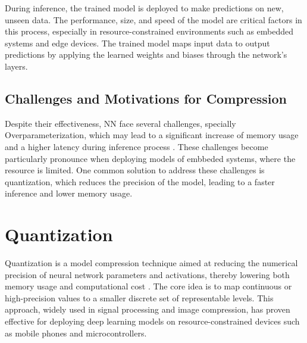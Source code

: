 During inference, the trained model is deployed to make predictions on new, unseen data. The performance, size, and speed of the model are critical factors in this process, especially in resource-constrained environments such as embedded systems and edge devices. The trained model maps input data to output predictions by applying the learned weights and biases through the network's layers.






\subsection{Challenges and Motivations for Compression}
Despite their effectiveness, NN face several challenges, specially Overparameterization, which may lead to a significant increase of memory usage and a higher latency during inference process \cite{han2015deepcompression}. These challenges become particularly pronounce when deploying models of embbeded systems, where the resource is limited. One common solution to address these challenges is quantization, which reduces the precision of the model, leading to a faster inference and lower memory usage. 



\section{Quantization}


Quantization is a model compression technique aimed at reducing the numerical precision of neural network parameters and activations, thereby lowering both memory usage and computational cost \cite{jacob2018quantization,han2016deep}. The core idea is to map continuous or high-precision values to a smaller discrete set of representable levels. This approach, widely used in signal processing and image compression, has proven effective for deploying deep learning models on resource-constrained devices such as mobile phones and microcontrollers.

